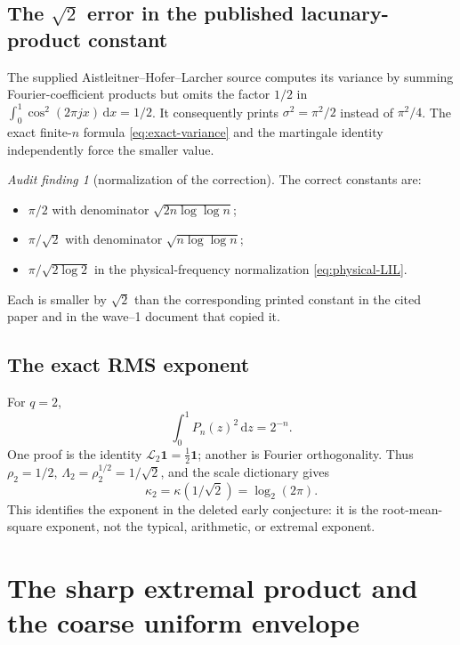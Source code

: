 \documentclass[11pt,oneside]{article}
\theoremstyle{definition}
\theoremstyle{remark}
\newtheorem{auditfinding}[theorem]{Audit finding}
\newcommand{\dd}{\,\mathrm d}
\newcommand{\Lop}{\mathcal L}
\begin{document}
\subsection{The \texorpdfstring{\(\sqrt2\)}{sqrt(2)} error in the published lacunary-product constant}

The supplied Aistleitner--Hofer--Larcher source computes its variance by
summing Fourier-coefficient products but omits the factor \(1/2\) in
\(\int_0^1\cos^2(2\pi jx)\dd x=1/2\).  It consequently prints
\(\sigma^2=\pi^2/2\) instead of \(\pi^2/4\).  The exact finite-\(n\) formula
\eqref{eq:exact-variance} and the martingale identity independently force the
smaller value.

\begin{auditfinding}[normalization of the correction]
\label{finding:LIL-correction}
The correct constants are:
\begin{itemize}
\item \(\pi/2\) with denominator \(\sqrt{2n\log\log n}\);
\item \(\pi/\sqrt2\) with denominator \(\sqrt{n\log\log n}\);
\item \(\pi/\sqrt{2\log2}\) in the physical-frequency normalization
\eqref{eq:physical-LIL}.
\end{itemize}
Each is smaller by \(\sqrt2\) than the corresponding printed constant in the
cited paper and in the wave--1 document that copied it.
\end{auditfinding}

\subsection{The exact RMS exponent}

For \(q=2\),
\begin{equation}
 \int_0^1P_n(z)^2\dd z=2^{-n}.
 \label{eq:Pn-L2}
\end{equation}
One proof is the identity \(\Lop_2\mathbf1=\tfrac12\mathbf1\); another is
Fourier orthogonality.  Thus \(\rho_2=1/2\),
\(\Lambda_2=\rho_2^{1/2}=1/\sqrt2\), and the scale dictionary gives
\begin{equation}
 \kappa_2=\kappa(1/\sqrt2)=\log_2(2\pi).
 \label{eq:kappa2}
\end{equation}
This identifies the exponent in the deleted early conjecture: it is the
root-mean-square exponent, not the typical, arithmetic, or extremal exponent.

\section{The sharp extremal product and the coarse uniform envelope}
\label{sec:extremal}
\end{document}
